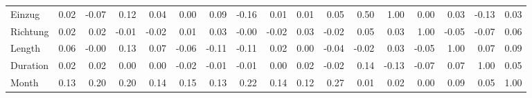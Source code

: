 \begin{tabular}{lrrrrrrrrrrrrrrrr}
Einzug        &  0.02 & -0.07 &  0.12 &  0.04 &   0.00 &   0.09 & -0.16 &   0.01 &   0.01 &  0.05 &           0.50 &    1.00 &      0.00 &    0.03 &     -0.13 &   0.03 \\
Richtung      &  0.02 &  0.02 & -0.01 & -0.02 &   0.01 &   0.03 & -0.00 &  -0.02 &   0.03 & -0.02 &           0.05 &    0.03 &      1.00 &   -0.05 &     -0.07 &   0.06 \\
Length        &  0.06 & -0.00 &  0.13 &  0.07 &  -0.06 &  -0.11 & -0.11 &   0.02 &   0.00 & -0.04 &          -0.02 &    0.03 &     -0.05 &    1.00 &      0.07 &   0.09 \\
Duration      &  0.02 &  0.02 &  0.00 &  0.00 &  -0.02 &  -0.01 & -0.01 &   0.00 &   0.02 & -0.02 &           0.14 &   -0.13 &     -0.07 &    0.07 &      1.00 &   0.05 \\
Month         &  0.13 &  0.20 &  0.20 &  0.14 &   0.15 &   0.13 &  0.22 &   0.14 &   0.12 &  0.27 &           0.01 &    0.02 &      0.00 &    0.09 &      0.05 &   1.00 \\
\bottomrule
\end{tabular}
